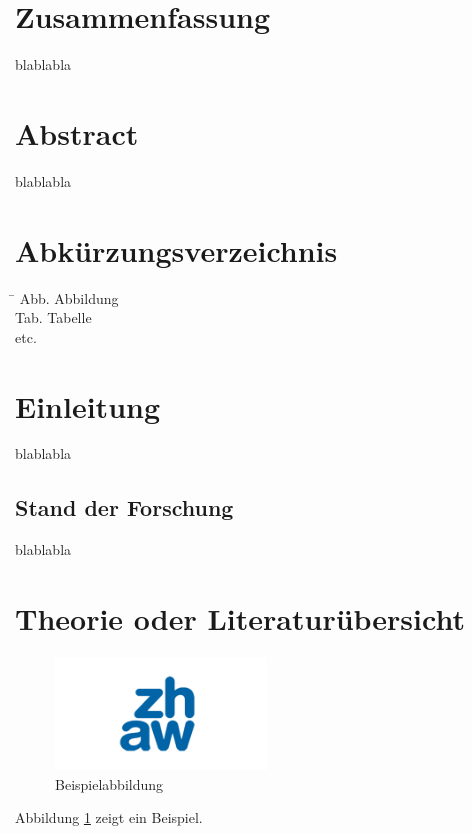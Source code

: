 \documentclass[a4paper,12pt,twoside]{article}
\begin{document}
	
	\newpage
	\section*{Zusammenfassung}
	blablabla
	
	\newpage
	\section*{Abstract}
	blablabla
	
	\newpage
	\section*{Abkürzungsverzeichnis}
	\begin{tabbing}
		\hspace*{3cm} \= \kill
		Abb. \> Abbildung\\
		Tab. \> Tabelle\\
		etc.
	\end{tabbing}
	
	
	\newpage
	\tableofcontents
	\thispagestyle{empty}
	
	
	\newpage
	\pagestyle{standard} %
	\section{Einleitung}
	blablabla
	\subsection{Stand der Forschung}
	blablabla
	
	
	\newpage
	\section{Theorie oder Literaturübersicht}
	
	\begin{figure}[b] %
		\raggedright %
		\includegraphics[width=0.5\textwidth]{zhawGR_logo.png} %
		\caption{Beispielabbildung}
		\label{fig:beispiel}
	\end{figure}
	Abbildung \ref{fig:beispiel} zeigt ein Beispiel.
	
\end{document}
